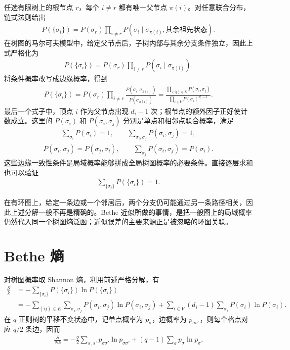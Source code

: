任选有限树上的根节点 \(r\)，每个 \(i\neq r\) 都有唯一父节点 \(\pi(i)\)。对任意联合分布，链式法则给出
\begin{align*}
	P(\{\sigma_i\})
	=P(\sigma_r)\prod_{i\neq r}P(\sigma_i\mid \sigma_{\pi(i)},\text{其余祖先状态}).
\end{align*}
在树图的马尔可夫模型中，给定父节点后，子树内部与其余分支条件独立，因此上式严格化为
\begin{align*}
	P(\{\sigma_i\})
	=P(\sigma_r)\prod_{i\neq r}P(\sigma_i\mid\sigma_{\pi(i)}).
\end{align*}
将条件概率改写成边缘概率，得到
\begin{align*}
	P(\{\sigma_i\})
	=P(\sigma_r)\prod_{i\neq r}
	\frac{P(\sigma_i,\sigma_{\pi(i)})}{P(\sigma_{\pi(i)})}
	=\frac{\displaystyle\prod_{(ij)\in E}P(\sigma_i,\sigma_j)}
	{\displaystyle\prod_{i\in V}P(\sigma_i)^{d_i-1}} .
\end{align*}
最后一个式子中，顶点 \(i\) 作为父节点出现 \(d_i-1\) 次；根节点的额外因子正好使计数成立。这里的 \(P(\sigma_i)\) 和 \(P(\sigma_i,\sigma_j)\) 分别是单点和相邻点联合概率，满足
\begin{align*}
	\sum_{\sigma_i}P(\sigma_i)=1,\qquad
	\sum_{\sigma_i,\sigma_j}P(\sigma_i,\sigma_j)=1,
\end{align*}
\begin{align*}
	P(\sigma_i,\sigma_j)=P(\sigma_j,\sigma_i),\qquad
	\sum_{\sigma_j}P(\sigma_i,\sigma_j)=P(\sigma_i).
\end{align*}
这些边缘一致性条件是局域概率能够拼成全局树图概率的必要条件。直接逐层求和也可以验证
\begin{align*}
	\sum_{\{\sigma_i\}}P(\{\sigma_i\})=1.
\end{align*}

在有环图上，给定一条边或一个邻居后，两个分支仍可能通过另一条路径相关，因此上述分解一般不再是精确的。Bethe 近似所做的事情，是把一般图上的局域概率仍然代入同一个树图熵泛函；近似误差的主要来源正是被忽略的环图关联。

\section{Bethe 熵}

对树图概率取 Shannon 熵，利用前述严格分解，有
\begin{align*}
	\frac{S}{k}
	&=-\sum_{\{\sigma_i\}}P(\{\sigma_i\})\ln P(\{\sigma_i\})\\
	&=-\sum_{(ij)\in E}\sum_{\sigma_i,\sigma_j}
	P(\sigma_i,\sigma_j)\ln P(\sigma_i,\sigma_j)
	+\sum_{i\in V}(d_i-1)\sum_{\sigma_i}
	P(\sigma_i)\ln P(\sigma_i).
\end{align*}
在 \(q\)-正则树的平移不变状态中，记单点概率为 \(p_\sigma\)，边概率为 \(p_{\sigma\sigma'}\)，则每个格点对应 \(q/2\) 条边，因而
\begin{align*}
	\frac{S}{Nk}
	=-\frac q2\sum_{\sigma,\sigma'}p_{\sigma\sigma'}\ln p_{\sigma\sigma'}
	+(q-1)\sum_\sigma p_\sigma\ln p_\sigma .
\end{align*}

